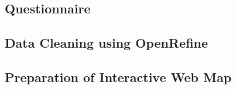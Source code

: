 \documentclass[a4paper,12pt,twoside]{article}
\begin{document}
\subsection{Questionnaire}

\begin{multicols}{2}
\lipsum[0-5]
\end{multicols}

\subsection{Data Cleaning using OpenRefine}

\begin{multicols}{2}
\lipsum[0-5]
\end{multicols}

\subsection{Preparation of Interactive Web Map}

\begin{multicols}{2}
\lipsum[0-5]
\end{multicols}
\end{document}
